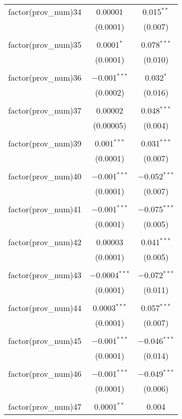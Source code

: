 \begin{table}[ht!]
\begin{tabular}{@{\extracolsep{5pt}}lcc}
 factor(prov\_num)34 & 0.00001 & 0.015$^{**}$ \\ 
  & (0.0001) & (0.007) \\ 
  & & \\ 
 factor(prov\_num)35 & 0.0001$^{*}$ & 0.078$^{***}$ \\ 
  & (0.0001) & (0.010) \\ 
  & & \\ 
 factor(prov\_num)36 & $-$0.001$^{***}$ & 0.032$^{*}$ \\ 
  & (0.0002) & (0.016) \\ 
  & & \\ 
 factor(prov\_num)37 & 0.00002 & 0.048$^{***}$ \\ 
  & (0.00005) & (0.004) \\ 
  & & \\ 
 factor(prov\_num)39 & 0.001$^{***}$ & 0.031$^{***}$ \\ 
  & (0.0001) & (0.007) \\ 
  & & \\ 
 factor(prov\_num)40 & $-$0.001$^{***}$ & $-$0.052$^{***}$ \\ 
  & (0.0001) & (0.007) \\ 
  & & \\ 
 factor(prov\_num)41 & $-$0.001$^{***}$ & $-$0.075$^{***}$ \\ 
  & (0.0001) & (0.005) \\ 
  & & \\ 
 factor(prov\_num)42 & 0.00003 & 0.041$^{***}$ \\ 
  & (0.0001) & (0.005) \\ 
  & & \\ 
 factor(prov\_num)43 & $-$0.0004$^{***}$ & $-$0.072$^{***}$ \\ 
  & (0.0001) & (0.011) \\ 
  & & \\ 
 factor(prov\_num)44 & 0.0003$^{***}$ & 0.057$^{***}$ \\ 
  & (0.0001) & (0.007) \\ 
  & & \\ 
 factor(prov\_num)45 & $-$0.001$^{***}$ & $-$0.046$^{***}$ \\ 
  & (0.0001) & (0.014) \\ 
  & & \\ 
 factor(prov\_num)46 & $-$0.001$^{***}$ & $-$0.049$^{***}$ \\ 
  & (0.0001) & (0.006) \\ 
  & & \\ 
 factor(prov\_num)47 & 0.0001$^{**}$ & 0.004 \\ 

\end{tabular}
\end{table}
